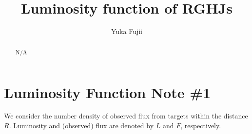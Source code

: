 \documentclass[12pt]{emulateapj}
\begin{document}
\renewcommand\bottomfraction{.9}
\newcommand{\PD}[2]{\frac{\partial {#1}}{\partial {#2}}}

\title{Luminosity function of RGHJs}
\author{Yuka Fujii}

\begin{abstract}
N/A
\end{abstract} 


\section{Luminosity Function Note \#1} 
\label{sec:luminosity function}





We consider the number density of observed flux from targets within the distance $R$. 
Luminosity and (observed) flux are denoted by $L$ and $F$, respectively. 
\vspace{1\baselineskip}
\end{document}
